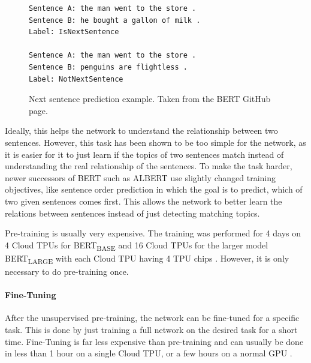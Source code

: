\begin{figure}[h]
\begin{lstlisting}[numbers=none]
Sentence A: the man went to the store .
Sentence B: he bought a gallon of milk .
Label: IsNextSentence

Sentence A: the man went to the store .
Sentence B: penguins are flightless .
Label: NotNextSentence
\end{lstlisting}
\caption[Next sentence prediction example]{Next sentence prediction example. Taken from the BERT GitHub page.}
\label{fig:bert_next_sentence_example}
\end{figure}

Ideally, this helps the network to understand the relationship between two sentences.
However, this task has been shown to be too simple for the network, as it is easier for it to just learn if the topics of two sentences match instead of understanding the real relationship of the sentences.
To make the task harder, newer successors of BERT such as ALBERT use slightly changed training objectives, like sentence order prediction \cite[p.~3]{1909.11942} in which the goal is to predict, which of two given sentences comes first.
This allows the network to better learn the relations between sentences instead of just detecting matching topics.

Pre-training is usually very expensive.
The training was performed for 4 days on 4 Cloud TPUs for BERT\textsubscript{BASE} and 16 Cloud TPUs for the larger model BERT\textsubscript{LARGE} with each Cloud TPU having 4 TPU chips \cite[p.~13]{devlin2018bert}.
However, it is only necessary to do pre-training once.

\paragraph{Fine-Tuning}

After the unsupervised pre-training, the network can be fine-tuned for a specific task.
This is done by just training a full network on the desired task for a short time.
Fine-Tuning is far less expensive than pre-training and can usually be done in less than 1 hour on a single Cloud TPU, or a few hours on a normal GPU \cite[p.~5]{devlin2018bert}.
